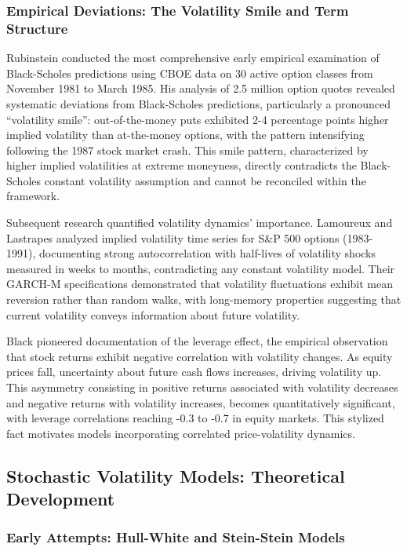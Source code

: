 \documentclass[12pt,a4paper]{article}
\begin{document}
\subsubsection{Empirical Deviations: The Volatility Smile and Term Structure}

Rubinstein \cite{Rubinstein1985} conducted the most comprehensive early empirical examination of Black-Scholes predictions using CBOE data on 30 active option classes from November 1981 to March 1985. His analysis of 2.5 million option quotes revealed systematic deviations from Black-Scholes predictions, particularly a pronounced ``volatility smile'': out-of-the-money puts exhibited 2-4 percentage points higher implied volatility than at-the-money options, with the pattern intensifying following the 1987 stock market crash. This smile pattern, characterized by higher implied volatilities at extreme moneyness, directly contradicts the Black-Scholes constant volatility assumption and cannot be reconciled within the framework.

Subsequent research quantified volatility dynamics' importance. Lamoureux and Lastrapes \cite{Lamoureux1993} analyzed implied volatility time series for S\&P 500 options (1983-1991), documenting strong autocorrelation with half-lives of volatility shocks measured in weeks to months, contradicting any constant volatility model. Their GARCH-M specifications demonstrated that volatility fluctuations exhibit mean reversion rather than random walks, with long-memory properties suggesting that current volatility conveys information about future volatility.

Black \cite{Black1976} pioneered documentation of the leverage effect, the empirical observation that stock returns exhibit negative correlation with volatility changes. As equity prices fall, uncertainty about future cash flows increases, driving volatility up. This asymmetry consisting in positive returns associated with volatility decreases and negative returns with volatility increases, becomes quantitatively significant, with leverage correlations reaching -0.3 to -0.7 in equity markets. This stylized fact motivates models incorporating correlated price-volatility dynamics.

\subsection{Stochastic Volatility Models: Theoretical Development}

\subsubsection{Early Attempts: Hull-White and Stein-Stein Models}
\end{document}
